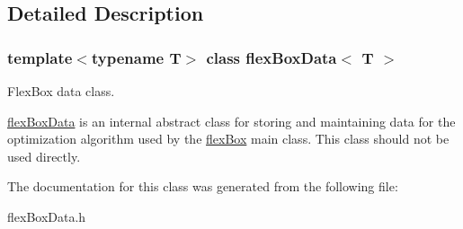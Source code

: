 \subsection{Detailed Description}
\subsubsection*{template$<$typename T$>$\newline
class flex\+Box\+Data$<$ T $>$}

Flex\+Box data class. 

\hyperlink{classflex_box_data}{flex\+Box\+Data} is an internal abstract class for storing and maintaining data for the optimization algorithm used by the \hyperlink{classflex_box}{flex\+Box} main class. This class should not be used directly. 

The documentation for this class was generated from the following file\+:\begin{DoxyCompactItemize}
\item 
flex\+Box\+Data.\+h\end{DoxyCompactItemize}
